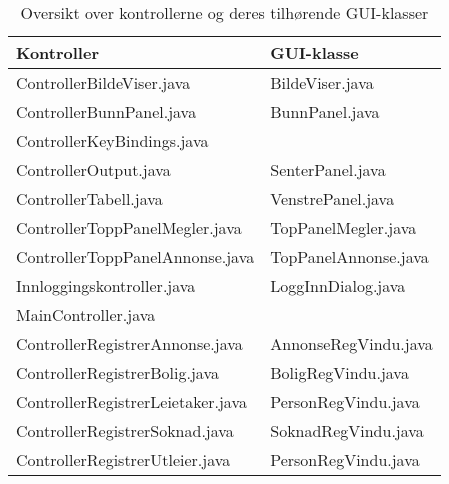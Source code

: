 \begin{table}[ht]
\caption{Oversikt over kontrollerne og deres tilhørende GUI-klasser}
\label{tab:kontrollerguikobling}
\begin{tabular}{|l|l|}

\hline
Kontroller						& GUI-klasse \\ \hline

ControllerBildeViser.java		& BildeViser.java \\
ControllerBunnPanel.java			& BunnPanel.java \\
ControllerKeyBindings.java		& \\
ControllerOutput.java			& SenterPanel.java \\
ControllerTabell.java			& VenstrePanel.java \\
ControllerToppPanelMegler.java	& TopPanelMegler.java \\
ControllerToppPanelAnnonse.java  & TopPanelAnnonse.java \\
Innloggingskontroller.java		& LoggInnDialog.java \\
MainController.java				& \\
ControllerRegistrerAnnonse.java  & AnnonseRegVindu.java \\
ControllerRegistrerBolig.java 	& BoligRegVindu.java \\
ControllerRegistrerLeietaker.java 	& PersonRegVindu.java \\
ControllerRegistrerSoknad.java 	& SoknadRegVindu.java \\
ControllerRegistrerUtleier.java 	& PersonRegVindu.java \\


\hline
\end{tabular}
\end{table}